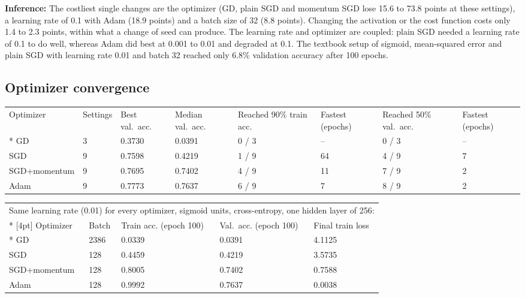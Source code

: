 \documentclass[12pt,a4paper]{article}
\begin{document}
\textbf{Inference:} The costliest single changes are the optimizer (GD, plain SGD and momentum SGD
lose 15.6 to 73.8 points at
these settings), a learning rate of 0.1 with Adam
(18.9 points) and a batch size of 32 (8.8 points).
Changing the activation or the cost function costs only 1.4 to
2.3 points, within what a change of seed can produce. The
learning rate and optimizer are coupled: plain SGD needed a learning rate of 0.1 to do well,
whereas Adam did best at 0.001 to 0.01 and degraded at 0.1. The textbook setup of sigmoid,
mean-squared error and plain SGD with learning rate 0.01 and batch 32 reached only
6.8\% validation accuracy after 100 epochs.

\subsection*{Optimizer convergence}
{\small\setlength{\tabcolsep}{4pt}
\begin{longtable}{p{2.9cm}p{1.1cm}p{1.4cm}p{1.4cm}p{1.7cm}p{1.4cm}p{1.7cm}p{1.4cm}}
\toprule
Optimizer & Settings & Best val.\ acc. & Median val.\ acc. & Reached 90\% train acc. & Fastest (epochs) & Reached 50\% val.\ acc. & Fastest (epochs) \\*
\midrule
GD & 3 & 0.3730 & 0.0391 & 0 / 3 & -- & 0 / 3 & -- \\
SGD & 9 & 0.7598 & 0.4219 & 1 / 9 & 64 & 4 / 9 & 7 \\
SGD+momentum & 9 & 0.7695 & 0.7402 & 4 / 9 & 11 & 7 / 9 & 2 \\
Adam & 9 & 0.7773 & 0.7637 & 6 / 9 & 7 & 8 / 9 & 2 \\
\bottomrule
\end{longtable}
}

{\small\setlength{\tabcolsep}{4pt}
\begin{longtable}{p{3.0cm}p{1.5cm}p{3.0cm}p{3.0cm}p{2.6cm}}
\multicolumn{5}{l}{\parbox[t]{14.5cm}{Same learning rate (0.01) for every optimizer, sigmoid units, cross-entropy, one hidden layer of 256:}} \\*
[4pt]
\toprule
Optimizer & Batch & Train acc. (epoch 100) & Val.\ acc. (epoch 100) & Final train loss \\*
\midrule
GD & 2386 & 0.0339 & 0.0391 & 4.1125 \\
SGD & 128 & 0.4459 & 0.4219 & 3.5735 \\
SGD+momentum & 128 & 0.8005 & 0.7402 & 0.7588 \\
Adam & 128 & 0.9992 & 0.7637 & 0.0038 \\
\bottomrule
\end{longtable}
}
\end{document}
